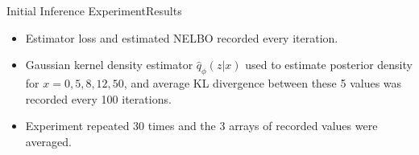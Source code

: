 \documentclass{beamer}
\begin{document}
\begin{frame}{Initial Inference Experiment}{Results}
\begin{itemize}
\item Estimator loss and estimated NELBO recorded every iteration.
\item Gaussian kernel density estimator $\hat{q}_\phi(z|x)$ used to estimate posterior density for $x=0,5,8,12,50$, and average KL divergence between these 5 values was recorded every 100 iterations.
\item Experiment repeated 30 times and the 3 arrays of recorded values were averaged.
\end{itemize}
\begin{table}[h]
\end{table}

\end{frame}
\end{document}
